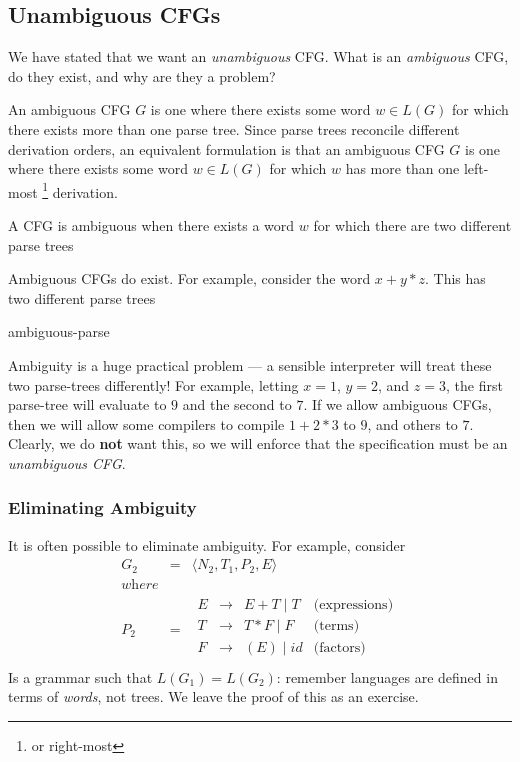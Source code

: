 \subsection{Unambiguous CFGs}\label{section:cfg-ambiguity}
We have stated that we want an \textit{unambiguous} CFG. What is an \textit{ambiguous} CFG, do they exist, and why are they a problem?

An ambiguous CFG $G$ is one where there exists some word $w \in L(G)$ for which there exists more than one parse tree. Since parse trees reconcile different derivation orders, an equivalent formulation is that an ambiguous CFG $G$ is one where there exists some word $w \in L(G)$ for which $w$ has more than one left-most \footnote{or right-most} derivation.

\begin{definition}
    A CFG is ambiguous when there exists a word $w$ for which there are two different parse trees
\end{definition}

Ambiguous CFGs do exist. For example, consider the word $x + y * z$. This has two different parse trees

{ambiguous-parse}

Ambiguity is a huge practical problem --- a sensible interpreter will treat these two parse-trees differently! For example, letting $x = 1$, $y = 2$, and $z = 3$, the first parse-tree will evaluate to $9$ and the second to $7$. If we allow ambiguous CFGs, then we will allow some compilers to compile $1 + 2 * 3$ to $9$, and others to $7$. Clearly, we do \textbf{not} want this, so we will enforce that the specification must be an \textit{unambiguous CFG}.

\subsubsection{Eliminating Ambiguity}\label{section:ambiguity-elim}
It is often possible to eliminate ambiguity. For example, consider
\[
\begin{array}{rcll}
G_2 &=& \langle N_2, T_1, P_2, E \rangle\\[1ex]
\textit{where} \\
P_2 &=& \begin{array}{rcll}
E &\to& E + T \mid T & \text{(expressions)}\\
T &\to& T * F \mid F & \text{(terms)}\\
F &\to& (E) \mid id & \text{(factors)}\\
\end{array}
\end{array}
\]
Is a grammar such that $L(G_1) = L(G_2)$: remember languages are defined in terms of \textit{words}, not trees. We leave the proof of this as an exercise.

